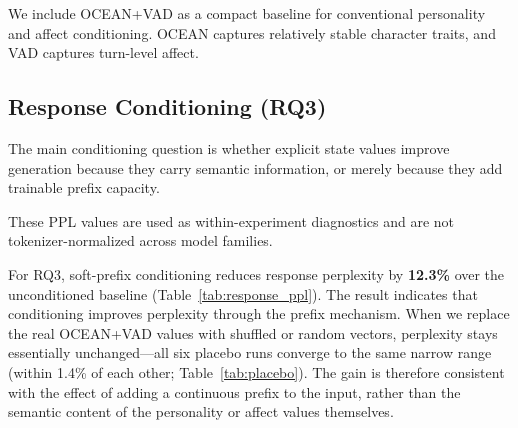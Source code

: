 \documentclass[11pt]{article}
\begin{document}
We include OCEAN+VAD as a compact baseline for conventional personality and affect conditioning. OCEAN captures relatively stable character traits, and VAD captures turn-level affect.

\subsection{Response Conditioning (RQ3)}

The main conditioning question is whether explicit state values improve generation because they carry semantic information, or merely because they add trainable prefix capacity.

\begin{table}[t]
\centering
\caption{Response generation comparison. \textbf{Bold}: best PPL. The soft-prefix gain is $12.3\%$, but placebo ablations show this gain is not attributable to the semantic content of OCEAN+VAD values. ConditionalDialogue reports mean across 3 seeds (42--44).}
\label{tab:response_ppl}
\small
{}
\end{table}

These PPL values are used as within-experiment diagnostics and are not tokenizer-normalized across model families.

For RQ3, soft-prefix conditioning reduces response perplexity by \textbf{12.3\%} over the unconditioned baseline (Table~\ref{tab:response_ppl}).
The result indicates that conditioning improves perplexity through the prefix mechanism.
When we replace the real OCEAN+VAD values with shuffled or random vectors, perplexity stays essentially unchanged---all six placebo runs converge to the same narrow range (within 1.4\% of each other; Table~\ref{tab:placebo}).
The gain is therefore consistent with the effect of adding a continuous prefix to the input, rather than the semantic content of the personality or affect values themselves.
\end{document}
